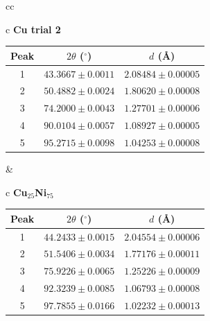 \documentclass[12pt]{article}
\begin{document}
\begin{table}[H]
\begin{tabular}{cc}
\begin{tabular}{c}
\textbf{Cu trial 2}\\[-2pt]
\begin{tabular}{ccc}
\hline
Peak & $2\theta$ ($^\circ$) & $d$ (\AA)\\
\hline
1 & $43.3667 \pm 0.0011$ & $2.08484 \pm 0.00005$\\
2 & $50.4882 \pm 0.0024$ & $1.80620 \pm 0.00008$\\
3 & $74.2000 \pm 0.0043$ & $1.27701 \pm 0.00006$\\
4 & $90.0104 \pm 0.0057$ & $1.08927 \pm 0.00005$\\
5 & $95.2715 \pm 0.0098$ & $1.04253 \pm 0.00008$\\
\hline
\end{tabular}
\end{tabular}
&
\begin{tabular}{c}
\textbf{Cu$_{25}$Ni$_{75}$}\\[-2pt]
\begin{tabular}{ccc}
\hline
Peak & $2\theta$ ($^\circ$) & $d$ (\AA)\\
\hline
1 & $44.2433 \pm 0.0015$ & $2.04554 \pm 0.00006$\\
2 & $51.5406 \pm 0.0034$ & $1.77176 \pm 0.00011$\\
3 & $75.9226 \pm 0.0065$ & $1.25226 \pm 0.00009$\\
4 & $92.3239 \pm 0.0085$ & $1.06793 \pm 0.00008$\\
5 & $97.7855 \pm 0.0166$ & $1.02232 \pm 0.00013$\\
\hline
\end{tabular}
\end{tabular}
\\[8pt]


\end{tabular}
\end{table}
\end{document}

